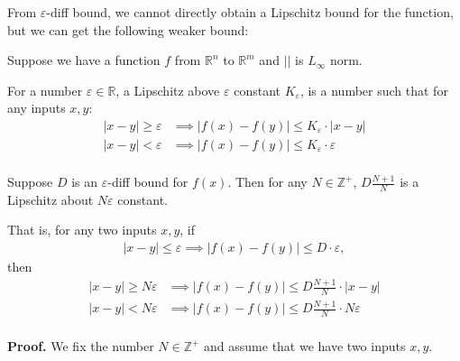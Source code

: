 	From $\varepsilon$-diff bound, we cannot directly obtain a Lipschitz bound for the function, but we can get the following weaker bound:
	
	\begin{definition}
		Suppose we have a function $f$ from $\mathbb{R}^n$ to $\mathbb{R}^m$ and $||$ is $L_\infty$ norm. 
		
		For a number $\varepsilon\in\mathbb{R}$, a Lipschitz above $\varepsilon$ constant  $K_\varepsilon$,  is a number such that for any inputs $x,y$: \begin{align*}
			|x-y|\geq \varepsilon &\implies |f(x)-f(y)| \leq K_\varepsilon \cdot |x-y|\\
			|x-y|<\varepsilon &\implies |f(x)-f(y)| \leq K_\varepsilon \cdot \varepsilon\\
		\end{align*}		
	\end{definition}
	
	
	\begin{proposition}
		
		Suppose $D$ is an $\varepsilon$-diff bound for $f(x)$. Then for any $N\in\mathbb{Z}^+$, $D\frac{N+1}{N}$ is a Lipschitz about $N\varepsilon$ constant.
		
		That is, for any two inputs $x,y$, if \begin{align*}
			|x-y|\leq \varepsilon \implies |f(x)-f(y)| \leq D \cdot \varepsilon,
		\end{align*} then 	 \begin{align*}
			|x-y|\geq N\varepsilon &\implies |f(x)-f(y)| \leq D\frac{N+1}{N} \cdot |x-y|\\
			|x-y|<N\varepsilon &\implies |f(x)-f(y)| \leq D\frac{N+1}{N} \cdot N\varepsilon\\
		\end{align*}
	\end{proposition}
	
	\textbf{Proof.} We fix the number $N\in\mathbb{Z}^+$ and assume that we have two inputs $x, y$.
	
